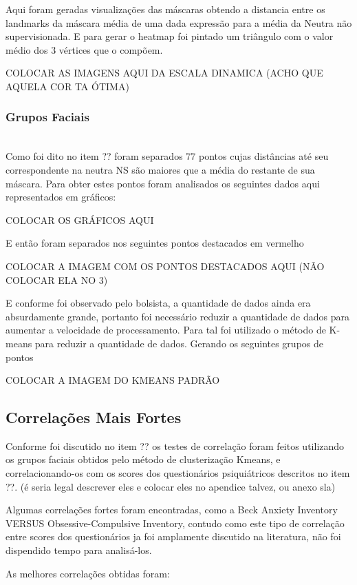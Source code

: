 Aqui foram geradas visualizações das máscaras obtendo a distancia entre os landmarks da máscara média de uma dada expressão para a média da Neutra não supervisionada. E para gerar o heatmap foi pintado um triângulo com o valor médio dos 3 vértices que o compõem.

COLOCAR AS IMAGENS AQUI DA ESCALA DINAMICA (ACHO QUE AQUELA COR TA ÓTIMA)

\subsubsection{Grupos Faciais}\mbox{}\\
Como foi dito no item ?? foram separados 77 pontos cujas distâncias até seu correspondente na neutra NS são maiores que a média do restante de sua máscara.
Para obter estes pontos foram analisados os seguintes dados aqui representados em gráficos:

COLOCAR OS GRÁFICOS AQUI

E então foram separados nos seguintes pontos destacados em vermelho

COLOCAR A IMAGEM COM OS PONTOS DESTACADOS AQUI (NÃO COLOCAR ELA NO 3)

E conforme foi observado pelo bolsista, a quantidade de dados ainda era absurdamente grande, portanto foi necessário reduzir a quantidade de dados para aumentar a velocidade de processamento. Para tal foi utilizado o método de K-means para reduzir a quantidade de dados. Gerando os seguintes grupos de pontos

COLOCAR A IMAGEM DO KMEANS PADRÃO

\subsection{Correlações Mais Fortes}
Conforme foi discutido no item ?? os testes de correlação foram feitos utilizando os grupos faciais obtidos pelo método de clusterização Kmeans, e correlacionando-os com os scores dos questionários psiquiátricos descritos no item ??. (é seria legal descrever eles e colocar eles no apendice talvez, ou anexo sla)

Algumas correlações fortes foram encontradas, como a Beck Anxiety Inventory VERSUS Obsessive-Compulsive Inventory, contudo como este tipo de correlação entre scores dos questionários ja foi amplamente discutido na literatura, não foi dispendido tempo para analisá-los.

As melhores correlações obtidas foram:


